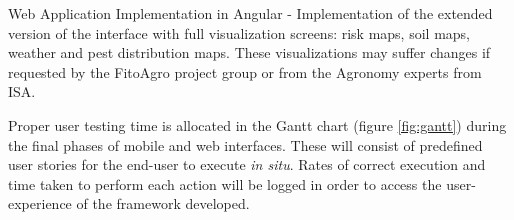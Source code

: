 Web Application Implementation in Angular - Implementation of the extended version of the interface with full visualization screens: risk maps, soil maps, weather and pest distribution maps. These visualizations may suffer changes if requested by the FitoAgro project group or from the Agronomy experts from ISA.

Proper user testing time is allocated in the Gantt chart (figure \ref{fig:gantt}) during the final phases of mobile and web interfaces. These will consist of predefined user stories for the end-user to execute \emph{in situ}. Rates of correct execution and time taken to perform each action will be logged in order to access the user-experience of the framework developed.
